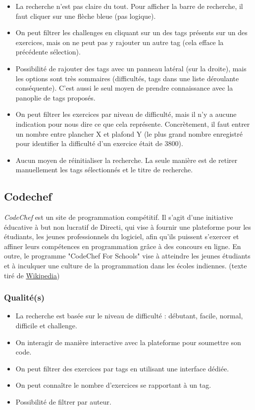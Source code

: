 \begin{itemize}
    \item La recherche n'est pas claire du tout. Pour afficher la barre de recherche, il faut cliquer sur une flèche bleue (pas logique).
    \item On peut filtrer les challenges en cliquant sur un des \glspl{tag} présents sur un des exercices, mais on ne peut pas y rajouter un autre \gls{tag} (cela efface la précédente sélection).
    \item Possibilité de rajouter des \glspl{tag} avec un panneau latéral (sur la droite), mais les options sont très sommaires (difficultés, \glspl{tag} dans une liste déroulante conséquente). C'est aussi le seul moyen de prendre connaissance avec la panoplie de \glspl{tag} proposés.
    \item On peut filtrer les exercices par niveau de difficulté, mais il n'y a aucune indication pour nous dire ce que cela représente. Concrètement, il faut entrer un nombre entre plancher X et plafond Y (le plus grand nombre enregistré pour identifier la difficulté d'un exercice était de 3800).
    \item Aucun moyen de réinitialiser la recherche. La seule manière est de retirer manuellement les \glspl{tag} sélectionnés et le titre de recherche.
\end{itemize}

\subsection*{Codechef}

\textit{CodeChef} est un site de programmation compétitif. Il s'agit d'une initiative éducative à but non lucratif de Directi, qui vise à fournir une plateforme pour les étudiants, les jeunes professionnels du logiciel, afin qu'ils puissent s'exercer et affiner leurs compétences en programmation grâce à des concours en ligne. En outre, le programme "CodeChef For Schools" vise à atteindre les jeunes étudiants et à inculquer une culture de la programmation dans les écoles indiennes. (texte tiré de \href{https://en.wikipedia.org/wiki/CodeChef}{Wikipedia})


\subsubsection*{Qualité(s)}

\begin{itemize}
    \item La recherche est basée sur le niveau de difficulté : débutant, facile, normal, difficile et challenge.
    \item On interagir de manière interactive avec la plateforme pour soumettre son code.
    \item On peut filtrer des exercices par \glspl{tag} en utilisant une interface dédiée.
    \item On peut connaître le nombre d'exercices se rapportant à un \gls{tag}.
    \item Possibilité de filtrer par auteur.
\end{itemize}

